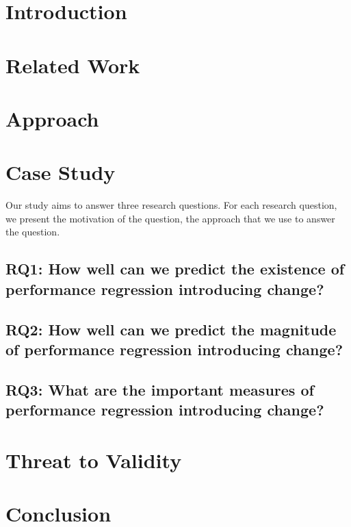 \documentclass[conference]{IEEEtran}
\begin{document}
%
\IEEEpeerreviewmaketitle

\section{Introduction}
\label{sec:intro}


\section{Related Work}
\label{sec:related}


\section{Approach}
\label{sec:case}


\section{Case Study}
\label{sec:results}

Our study aims to answer three research questions. For each research question, we present 
the motivation of the question, the approach that we use to answer the question.

\subsection*{RQ1: How well can we predict the existence of performance regression introducing change?}


\subsection*{RQ2: How well can we predict the magnitude of performance regression introducing change?}


\subsection*{RQ3: What are the important measures of performance regression introducing change?}



%

\section{Threat to Validity}
\label{sec:threats}


\section{Conclusion}
\label{sec:conclusion}



 


\end{document}
